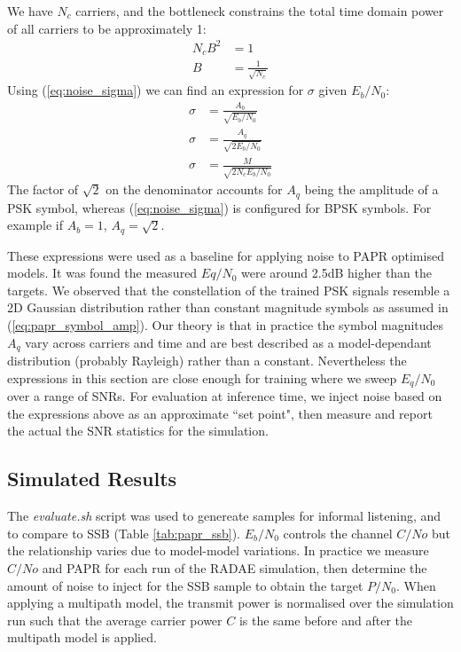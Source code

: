 \documentclass{article}
\begin{document}
We have $N_c$ carriers, and the bottleneck constrains the total time domain power of all carriers to be approximately 1:
\begin{equation}
\label{eq:papr_symbol_amp}
\begin{split}
N_cB^2 &= 1 \\
B        &= \frac{1}{\sqrt{N_c}}
\end{split}
\end{equation}
Using (\ref{eq:noise_sigma}) we can find an expression for $\sigma$ given $E_b/N_0$:
\begin{equation}
\begin{split}
\sigma &= \frac{A_b}{\sqrt{E_b/N_0}} \\
\sigma &= \frac{A_q}{\sqrt{2 E_b/N_0}} \\
\sigma &= \frac{M}{\sqrt{2 N_c E_b/N_0}} 
\end{split}
\end{equation}
The factor of $\sqrt{2}$ on the denominator accounts for $A_q$ being the amplitude of a PSK symbol, whereas (\ref{eq:noise_sigma}) is configured for BPSK symbols. For example if $A_b=1$, $A_q=\sqrt{2}$.

These expressions were used as a baseline for applying noise to PAPR optimised models. It was found the measured $Eq/N_0$ were around 2.5dB higher than the targets.  We observed that the constellation of the trained PSK signals resemble a 2D Gaussian distribution rather than constant magnitude symbols as assumed in (\ref{eq:papr_symbol_amp}).  Our theory is that in practice the symbol magnitudes $A_q$ vary across carriers and time and are best described as a model-dependant distribution (probably Rayleigh) rather than a constant.  Nevertheless the expressions in this section are close enough for training where we sweep $E_q/N_0$ over a range of SNRs. For evaluation at inference time, we inject noise based on the expressions above as an approximate ``set point", then measure and report the actual the SNR statistics for the simulation.

\subsection{Simulated Results}

The \emph{evaluate.sh} script was used to genereate samples for informal listening, and to compare to SSB (Table \ref{tab:papr_ssb}). $E_b/N_0$ controls the channel $C/No$ but the relationship varies due to model-model variations. In practice we measure $C/No$ and PAPR for each run of the RADAE simulation, then determine the amount of noise to inject for the SSB sample to obtain the target $P/N_0$. When applying a multipath model, the transmit power is normalised over the simulation run such that the average carrier power $C$ is the same before and after the multipath model is applied.
\end{document}
